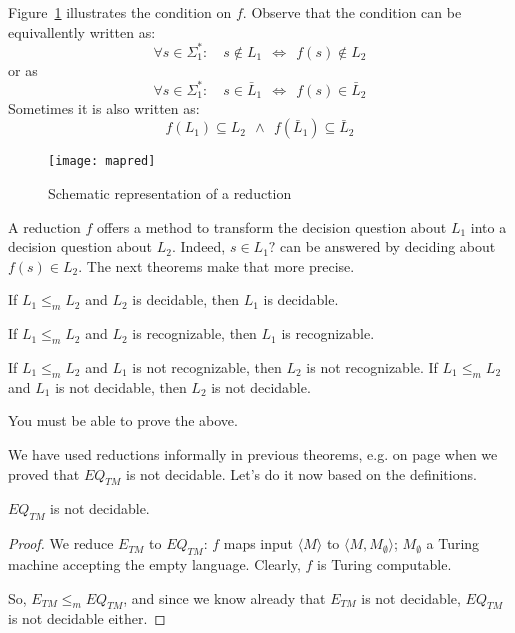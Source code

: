 Figure~\ref{mapred} illustrates the condition on $f$. Observe that
the condition can be equivallently written as:
\begin{equation*}
\forall s \in \Sigma_1^*: \quad s \not\in L_1 ~~\Leftrightarrow~~ f(s) \not\in L_2
\end{equation*}
or as
\begin{equation*}
\forall s \in \Sigma_1^*: \quad s \in \bar{L}_1 ~~\Leftrightarrow~~ f(s) \in \bar{L}_2
\end{equation*}
Sometimes it is also written as:
\begin{equation*}
f(L_1) \subseteq L_2 ~~\wedge~~ f(\bar{L}_1) \subseteq \bar{L}_2
\end{equation*}

\begin{figure}[th]
	\centering
	\texttt{[image: mapred]}
	\caption{Schematic representation of a reduction\label{mapred}}
\end{figure}



A reduction $f$ offers a method to transform the decision question
about $L_1$ into a decision question about $L_2$. Indeed,
$s \in L_1?$ can be answered by deciding about $f(s) \in L_2$. The
next theorems make that more precise. 

\begin{theorem}
If $L_1 \leq_m L_2$ and $L_2$ is decidable, then $L_1$ is decidable.
\end{theorem}

\begin{theorem}
If $L_1 \leq_m L_2$ and $L_2$ is recognizable, then $L_1$ is recognizable.
\end{theorem}

\begin{corollary}
If $L_1 \leq_m L_2$ and $L_1$ is not recognizable, then $L_2$ is not
recognizable.  If $L_1 \leq_m L_2$ and $L_1$ is not decidable, then
$L_2$ is not decidable.
\end{corollary}
You must be able to prove the above.

We have used reductions informally in previous theorems, e.g. on page
\pageref{reduction1} when we proved that $EQ_{TM}$ is not decidable.
Let's do it now based on the definitions.

\begin{theorem}
$EQ_{TM}$ is not decidable.
\end{theorem}
\begin{proof}
We reduce $E_{TM}$ to $EQ_{TM}$: $f$ maps input $\langle M \rangle$ to
$\langle M,M_{\emptyset} \rangle$; $M_{\emptyset}$ a Turing machine accepting the
empty language. Clearly, $f$ is Turing computable.

So, $E_{TM} \leq_m EQ_{TM}$, and since we know already that $E_{TM}$
is not decidable, $EQ_{TM}$ is not decidable either.
\end{proof}

